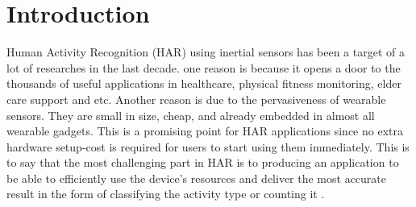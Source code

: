 \documentclass[journal,article,submit,moreauthors,pdftex]{Definitions/mdpi}
\begin{document}


\section{Introduction}

Human Activity Recognition (HAR) using inertial sensors has been a target of a lot of researches in the last decade. one reason is because it opens a door to the thousands of useful applications in healthcare, physical fitness monitoring, elder care support and etc. Another reason is due to the pervasiveness of wearable sensors. They are small in size, cheap, and already embedded in almost all wearable gadgets. This is a promising point for HAR applications since no extra hardware setup-cost is required for users to start using them immediately. This is to say that the most challenging part in HAR is to producing an application to be able to efficiently use the device's resources and deliver the most accurate result in the form of classifying the activity type or counting it \cite{schilit1994context}.\\
\end{document}
